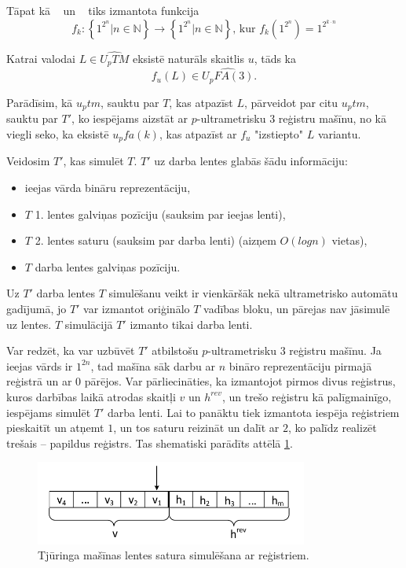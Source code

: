 \documentclass{ludis}
\begin{document}
Tāpat kā ~\citep{Macarie1995} un ~\citep{Monien1980} tiks izmantota funkcija
\[
	f_k : \left\{ 1^{2^n} | n \in \mathbb{N} \right\} \rightarrow \left\{ 1^{2^n} | n \in \mathbb{N} \right\} \textrm{, kur } f_k( 1^{2^n}) = 1^{2^{k \cdot n}}
\]

\begin{lemma} \label{skaititaji}
Katrai valodai $L \in \widehat{U_pTM}$ eksistē naturāls skaitlis $u$, tāds ka
\[
	f_u(L) \in \widehat{U_pFA(3)}.
\]
\end{lemma}
\begin{pieradijums}
Parādīsim, kā $u_ptm$, sauktu par $T$, kas atpazīst $L$, pārveidot par citu $u_ptm$, sauktu par $T'$, ko iespējams aizstāt ar $p$-ultrametrisku $3$ reģistru mašīnu, no kā viegli seko, ka eksistē $u_pfa(k)$, kas atpazīst ar $f_u$ "izstiepto" $L$ variantu.

Veidosim $T'$, kas simulēt $T$. $T'$ uz darba lentes glabās šādu informāciju:
\begin{itemize}
	\item ieejas vārda bināru reprezentāciju,
	\item $T$ 1. lentes galviņas pozīciju (sauksim par ieejas lenti),
	\item $T$ 2. lentes saturu (sauksim par darba lenti) (aizņem $O(log n)$ vietas),
	\item $T$ darba lentes galviņas pozīciju.
\end{itemize} %
Uz $T'$ darba lentes $T$ simulēšanu veikt ir vienkāršāk nekā ultrametrisko automātu gadījumā, jo $T'$ var izmantot oriģinālo $T$ vadības bloku, un pārejas nav jāsimulē uz lentes. $T$ simulācijā $T'$ izmanto tikai darba lenti.

Var redzēt, ka var uzbūvēt $T'$ atbilstošu $p$-ultrametrisku $3$ reģistru mašīnu. Ja ieejas vārds ir $1^{2n}$, tad mašīna sāk darbu ar $n$ bināro reprezentāciju pirmajā reģistrā un ar $0$ pārējos. Var pārliecināties, ka izmantojot pirmos divus reģistrus, kuros darbības laikā atrodas skaitļi $v$ un $h^{rev}$, un trešo reģistru kā palīgmainīgo, iespējams simulēt $T'$ darba lenti. Lai to panāktu tiek izmantota iespēja reģistriem pieskaitīt un atņemt $1$, un tos saturu reizināt un dalīt ar $2$, ko palīdz realizēt trešais -- papildus reģistrs. Tas shematiski parādīts attēlā \ref{fig:skaititaji}.

\begin{figure}[h!]
\centering
\includegraphics[width=0.8\textwidth]{Img/skaititaji.pdf}
\caption{Tjūringa mašīnas lentes satura simulēšana ar reģistriem.}
\label{fig:skaititaji}
\end{figure}


\end{pieradijums}
\end{document}
